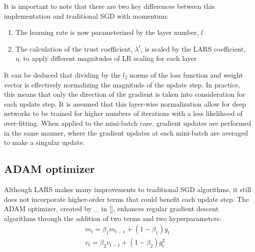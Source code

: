 
It is important to note that there are two key differences between this implementation and traditional SGD with momentum:
\begin{enumerate}
    \item The learning rate is now parameterized by the layer number, $l$
    \item The calculation of the trust coefficient, $\lambda^l$, is scaled by the LARS coefficient, $\eta$, to apply different magnitudes of LR scaling for each layer
\end{enumerate}
\vspace{4pt}

It can be deduced that dividing by the $l_2$ norms of the loss function and weight vector is effectively normalizing the magnitude of the update step. In practice, this means that only the direction of the gradient is taken into consideration for each update step. It is assumed that this layer-wise normalization allow for deep networks to be trained for higher numbers of iterations with a less likelihood of over-fitting. When applied to the mini-batch case, gradient updates are performed in the same manner, where the gradient updates at each mini-batch are averaged to make a singular update. 

\subsection*{ADAM optimizer}
Although LARS makes many improvements to traditional SGD algorithms, it still does not incorporate higher-order terms that could benefit each update step. The ADAM optimizer, created by \_ in [], enhances regular gradient descent algorithms through the addition of two terms and two hyperparameters:
\vspace{-10pt}
\begin{align*}
m_{t} = \beta_{1}m_{t-1}+(1-\beta_{1})g_{t} \\
v_{t} = \beta_{2}v_{t-1}+(1-\beta_{2})g_{t}^2
\end{align*}

